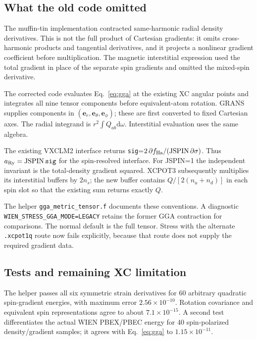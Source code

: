 \documentclass[11pt]{article}
\newcommand{\dd}{\mathrm d}
\begin{document}
\subsection{What the old code omitted}
The muffin-tin implementation contracted same-harmonic radial density derivatives. This is not the full product of Cartesian gradients: it omits cross-harmonic products and tangential derivatives, and it projects a nonlinear gradient coefficient before multiplication. The magnetic interstitial expression used the total gradient in place of the separate spin gradients and omitted the mixed-spin derivative.

The corrected code evaluates Eq.~\eqref{eq:gga} at the existing XC angular points and integrates all nine tensor components before equivalent-atom rotation. GRANS supplies components in $(\bm e_r,\bm e_\theta,\bm e_\phi)$; these are first converted to fixed Cartesian axes. The radial integrand is $r^2\int Q_{ab}\dd\omega$. Interstitial evaluation uses the same algebra.

The existing VXCLM2 interface returns \texttt{sig}=$2\,\partial f_{\rm Ha}/(\mathrm{JSPIN}\,\partial\sigma)$. Thus $a_{\rm Ry}=\mathrm{JSPIN}\,\texttt{sig}$ for the spin-resolved interface. For JSPIN=1 the independent invariant is the total-density gradient squared. XCPOT3 subsequently multiplies its interstitial buffers by $2n_s$; the new buffer contains $Q/[2(n_u+n_d)]$ in each spin slot so that the existing sum returns exactly $Q$.

The helper \nolinkurl{gga_metric_tensor.f} documents these conventions. A diagnostic \nolinkurl{WIEN_STRESS_GGA_MODE=LEGACY} retains the former GGA contraction for comparisons. The normal default is the full tensor. Stress with the alternate \texttt{.xcpot1q} route now fails explicitly, because that route does not supply the required gradient data.

\subsection{Tests and remaining XC limitation}
The helper passes all six symmetric strain derivatives for 60 arbitrary quadratic spin-gradient energies, with maximum error $2.56\times10^{-10}$. Rotation covariance and equivalent spin representations agree to about $7.1\times10^{-15}$. A second test differentiates the actual WIEN PBEX/PBEC energy for 40 spin-polarized density/gradient samples; it agrees with Eq.~\eqref{eq:gga} to $1.15\times10^{-11}$.
\end{document}
